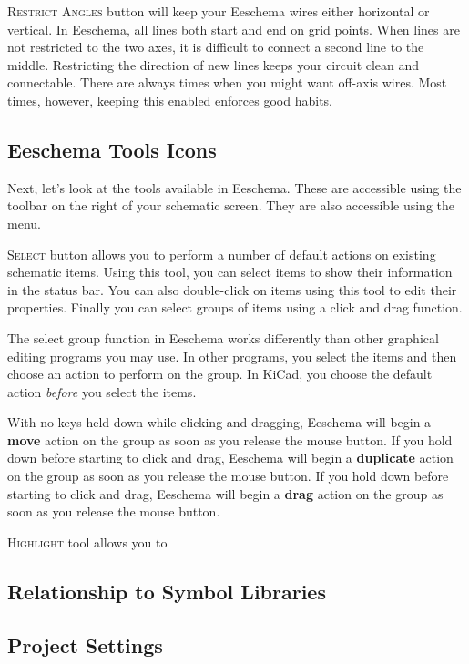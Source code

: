 \textsc{Restrict Angles} button will keep your Eeschema wires either horizontal or vertical.
In Eeschema, all lines both start and end on grid points.
When lines are not restricted to the two axes, it is difficult to connect a second line to the middle.
Restricting the direction of new lines keeps your circuit clean and connectable.
There are always times when you might want off-axis wires.
Most times, however, keeping this enabled enforces good habits.

\subsection{Eeschema Tools Icons}
Next, let's look at the tools available in Eeschema.
These are accessible using the toolbar on the right of your schematic screen.
They are also accessible using the  menu.

\textsc{Select} button allows you to perform a number of default actions on existing schematic items.
Using this tool, you can select items to show their information in the status bar.
You can also double-click on items using this tool to edit their properties.
Finally you can select groups of items using a click and drag function.

The select group function in Eeschema works differently than other graphical editing programs you may use.
In other programs, you select the items and then choose an action to perform on the group.
In KiCad, you choose the default action \textit{before} you select the items.

With no keys held down while clicking and dragging, Eeschema will begin a \textbf{move} action on the group as soon as you release the mouse button.
If you hold down  before starting to click and drag, Eeschema will begin a \textbf{duplicate} action on the group as soon as you release the mouse button.
If you hold down  before starting to click and drag, Eeschema will begin a \textbf{drag} action on the group as soon as you release the mouse button.

\textsc{Highlight} tool allows you to 

\subsection{Relationship to Symbol Libraries}
\subsection{Project Settings}

